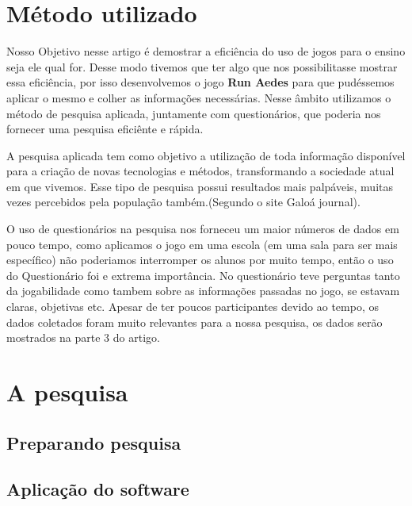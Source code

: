 \documentclass[12pt]{article}
\begin{document}
		
		
	\section{Método utilizado}%
		Nosso Objetivo nesse artigo é demostrar a eficiência do uso de jogos para o ensino seja ele qual for. Desse modo  tivemos que ter algo que nos possibilitasse mostrar essa eficiência, por isso desenvolvemos o jogo \textbf{Run Aedes} para que pudéssemos aplicar o mesmo e colher as informações necessárias. Nesse âmbito utilizamos o método de pesquisa aplicada, juntamente com questionários, que poderia nos fornecer uma pesquisa eficiênte e rápida.
		
		A pesquisa aplicada tem como objetivo a utilização de toda informação disponível para a criação de novas tecnologias e métodos, transformando a sociedade atual em que vivemos. Esse tipo de pesquisa possui resultados mais palpáveis, muitas vezes percebidos pela população também.(Segundo o site Galoá journal).
		
		O uso de questionários na pesquisa nos forneceu um maior números de dados em pouco tempo, como aplicamos o jogo em uma escola (em uma sala para ser mais específico) não poderiamos interromper os alunos por muito tempo, então o uso do Questionário foi e extrema importância. No questionário teve perguntas tanto da jogabilidade como tambem sobre as informações passadas no jogo, se estavam claras, objetivas etc. Apesar de ter poucos participantes devido ao tempo, os dados coletados foram muito relevantes para a nossa pesquisa, os dados serão mostrados na parte 3 do artigo.
	
	
	
	\section{A pesquisa} %
	
	\subsection{Preparando pesquisa} %
	\subsection{Aplicação do software}%
\end{document}
